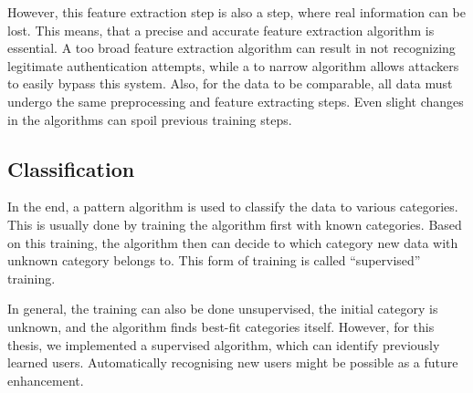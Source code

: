 However, this feature extraction step is also a step, where real information can be lost. This means, that a precise and accurate feature extraction algorithm is essential. A too broad feature extraction algorithm can result in not recognizing legitimate authentication attempts, while a to narrow algorithm allows attackers to easily bypass this system. Also, for the data to be comparable, all data must undergo the same preprocessing and feature extracting steps. Even slight changes in the algorithms can spoil previous training steps.

\subsection{Classification}
In the end, a pattern algorithm is used to classify the data to various categories. This is usually done by training the algorithm first with known categories. Based on this training, the algorithm then can decide to which category new data with unknown category belongs to. This form of training is called ``supervised'' training.

In general, the training can also be done unsupervised, \ie the initial category is unknown, and the algorithm finds best-fit categories itself. However, for this thesis, we implemented a supervised algorithm, which can identify previously learned users. Automatically recognising new users might be possible as a future enhancement.